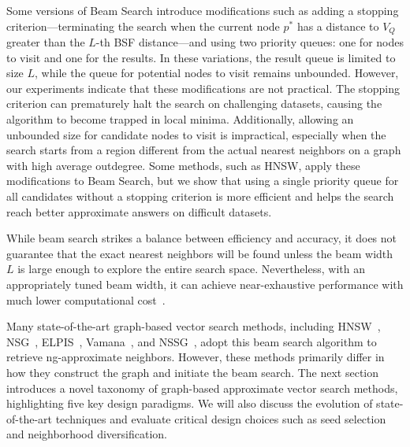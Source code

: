 Some versions of Beam Search introduce modifications such as adding a stopping criterion—terminating the search when the current node $p^*$ has a distance to $V_Q$ greater than the $L$-th BSF distance—and using two priority queues: one for nodes to visit and one for the results. In these variations, the result queue is limited to size $L$, while the queue for potential nodes to visit remains unbounded. However, our experiments indicate that these modifications are not practical. The stopping criterion can prematurely halt the search on challenging datasets, causing the algorithm to become trapped in local minima. Additionally, allowing an unbounded size for candidate nodes to visit is impractical, especially when the search starts from a region different from the actual nearest neighbors on a graph with high average outdegree. Some methods, such as HNSW, apply these modifications to Beam Search, but we show that using a single priority queue for all candidates without a stopping criterion is more efficient and helps the search reach better approximate answers on difficult datasets.





While beam search strikes a balance between efficiency and accuracy, it does not guarantee that the exact nearest neighbors will be found unless the beam width \(L\) is large enough to explore the entire search space. Nevertheless, with an appropriately tuned beam width, it can achieve near-exhaustive performance with much lower computational cost~\cite{beamsearch}.

Many state-of-the-art graph-based vector search methods, including HNSW~\cite{hnsw}, NSG~\cite{nsg}, ELPIS~\cite{elpis}, Vamana~\cite{vamana}, and NSSG~\cite{nssg}, adopt this beam search algorithm to retrieve ng-approximate neighbors. However, these methods primarily differ in how they construct the graph and initiate the beam search. The next section introduces a novel taxonomy of graph-based approximate vector search methods, highlighting five key design paradigms. We will also discuss the evolution of state-of-the-art techniques and evaluate critical design choices such as seed selection and neighborhood diversification.
